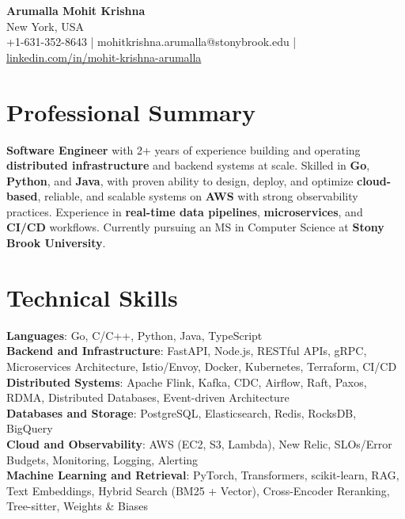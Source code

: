 \documentclass[letterpaper,11pt]{article}
\begin{document}
\begin{center}
  {\Large \textbf{Arumalla Mohit Krishna}} \\
  New York, USA \\
  +1-631-352-8643 \enspace | \enspace mohitkrishna.arumalla@stonybrook.edu \enspace | \enspace \href{https://www.linkedin.com/in/mohit-krishna-arumalla}{linkedin.com/in/mohit-krishna-arumalla}
\end{center}

\section{Professional Summary}
  \begin{itemize}[leftmargin=0.15in, label={}]
    \small{\item{
     \textbf{Software Engineer} with 2+ years of experience building and operating \textbf{distributed infrastructure} and backend systems at scale. Skilled in \textbf{Go}, \textbf{Python}, and \textbf{Java}, with proven ability to design, deploy, and optimize \textbf{cloud-based}, reliable, and scalable systems on \textbf{AWS} with strong observability practices. Experience in \textbf{real-time data pipelines}, \textbf{microservices}, and \textbf{CI/CD} workflows. Currently pursuing an MS in Computer Science at \textbf{Stony Brook University}.
    }}
  \end{itemize}
\vspace{-16pt}

\section{Technical Skills}
 \begin{itemize}[leftmargin=0.15in, label={}]
    \small{\item{
     \textbf{Languages}: Go, C/C++, Python, Java, TypeScript \\
     \textbf{Backend and Infrastructure}: FastAPI, Node.js, RESTful APIs, gRPC, Microservices Architecture, Istio/Envoy, Docker, Kubernetes, Terraform, CI/CD \\
     \textbf{Distributed Systems}: Apache Flink, Kafka, CDC, Airflow, Raft, Paxos, RDMA, Distributed Databases, Event-driven Architecture \\
     \textbf{Databases and Storage}: PostgreSQL, Elasticsearch, Redis, RocksDB, BigQuery \\
     \textbf{Cloud and Observability}: AWS (EC2, S3, Lambda), New Relic, SLOs/Error Budgets, Monitoring, Logging, Alerting \\
     \textbf{Machine Learning and Retrieval}: PyTorch, Transformers, scikit-learn, RAG, Text Embeddings, Hybrid Search (BM25 + Vector), Cross-Encoder Reranking, Tree-sitter, Weights \& Biases
    }}
 \end{itemize}
\vspace{-16pt}
\end{document}
